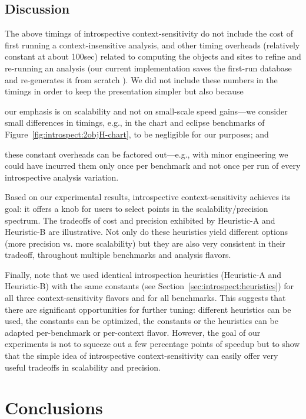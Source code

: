 \subsection{Discussion}
The above timings of introspective context-sensitivity do not include the cost of first running a context-insensitive analysis, and other timing overheads (relatively constant at about 100sec) related to computing the objects and sites to refine and re-running an analysis (our current implementation saves the first-run database and re-generates it from scratch \todo{}). We did not include these numbers in the timings in order to keep the presentation simpler but also because
\begin{inparaenum}[(a)]
\item our emphasis is on scalability and not on small-scale speed gains---we consider small differences in timings, e.g., in the chart and eclipse benchmarks of Figure~\ref{fig:introspect:2objH-chart}, to be negligible for our purposes; and
\item these constant overheads can be factored out---e.g., with minor engineering we could have incurred them only once per benchmark and not once per run of every introspective analysis variation.
\end{inparaenum}

Based on our experimental results, introspective context-sensitivity achieves its goal: it offers a knob for users to select points in the scalability/precision spectrum. The tradeoffs of cost and precision exhibited by Heuristic-A and Heuristic-B are illustrative. Not only do these heuristics yield different options (more precision vs. more scalability) but they are also very consistent in their tradeoff, throughout multiple benchmarks and analysis flavors.

Finally, note that we used identical introspection heuristics (Heuristic-A and Heuristic-B) with the same constants (see Section~\ref{sec:introspect:heuristics}) for all three context-sensitivity flavors and for all benchmarks. This suggests that there are significant opportunities for further tuning: different heuristics can be used, the constants can be optimized, the constants or the heuristics can be adapted per-benchmark or per-context flavor. However, the goal of our experiments is not to squeeze out a few percentage points of speedup but to show that the simple idea of introspective context-sensitivity can easily offer very useful tradeoffs in scalability and precision.


\section{Conclusions}

